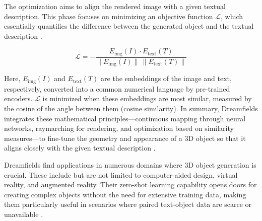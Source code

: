 The optimization aims to align the rendered image with a given textual description. This phase focuses on minimizing an objective function \( \mathcal{L} \), which essentially quantifies the difference between the generated object and the textual description \citep{jainDreamFields}.

\[
\mathcal{L} = -\frac{E_{\text{img}}(I) \cdot E_{\text{text}}(T)}{\| E_{\text{img}}(I) \| \, \| E_{\text{text}}(T) \|}
\]

Here, \( E_{\text{img}}(I) \) and \( E_{\text{text}}(T) \) are the embeddings of the image and text, respectively, converted into a common numerical language by pre-trained encoders. \( \mathcal{L} \) is minimized when these embeddings are most similar, measured by the cosine of the angle between them (cosine similarity). In summary, Dreamfields integrates these mathematical principles—continuous mapping through neural networks, raymarching for rendering, and optimization based on similarity measures—to fine-tune the geometry and appearance of a 3D object so that it aligns closely with the given textual description \citep{jainDreamFields}.

Dreamfields find applications in numerous domains where 3D object generation is crucial. These include but are not limited to computer-aided design, virtual reality, and augmented reality. Their zero-shot learning capability opens doors for creating complex objects without the need for extensive training data, making them particularly useful in scenarios where paired text-object data are scarce or unavailable \citep{jainDreamFields}.

